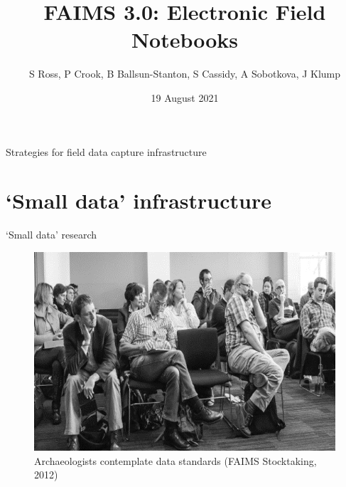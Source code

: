 \documentclass[aspectratio=169, 12pt]{beamer} %
\title{FAIMS 3.0: Electronic Field Notebooks} %
\author{S Ross, P Crook, B Ballsun-Stanton, S Cassidy, A Sobotkova, J Klump}   %
\institute{Australian Astronomical Optics seminar}   %
\date{19 August 2021}    %
\begin{document}

\maketitle

 


\begin{frame}{Strategies for field data capture infrastructure}
  \tableofcontents
\end{frame}

%



\section{`Small data' infrastructure}

\begin{frame}{`Small data' research}
 \begin{figure}[H]
    \centering
        \includegraphics[height=.75\textheight]{figures/Archaeologists-standards.png}
        \caption{Archaeologists contemplate data standards (FAIMS Stocktaking, 2012)}
        \label{fig:figure7}
 \end{figure}
\end{frame}
\end{document}
